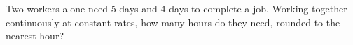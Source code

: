 Two workers alone need 5 days and 4 days to complete a job. Working together continuously at constant rates, how many hours do they need, rounded to the nearest hour?
